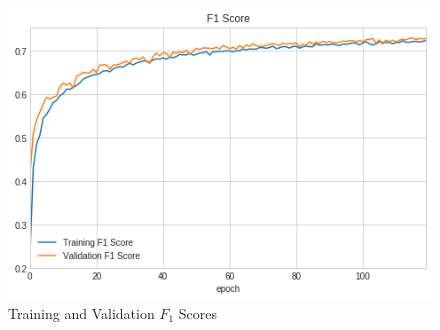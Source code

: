 \documentclass{article}
\begin{document}
\begin{figure}[h]
 \centering
  \includegraphics[width=1.0\linewidth]{figures/f1.png}
  \caption{
      Training and Validation $F_1$ Scores
  }
  \label{fig:f1}
\end{figure}


\bigskip
\end{document}
